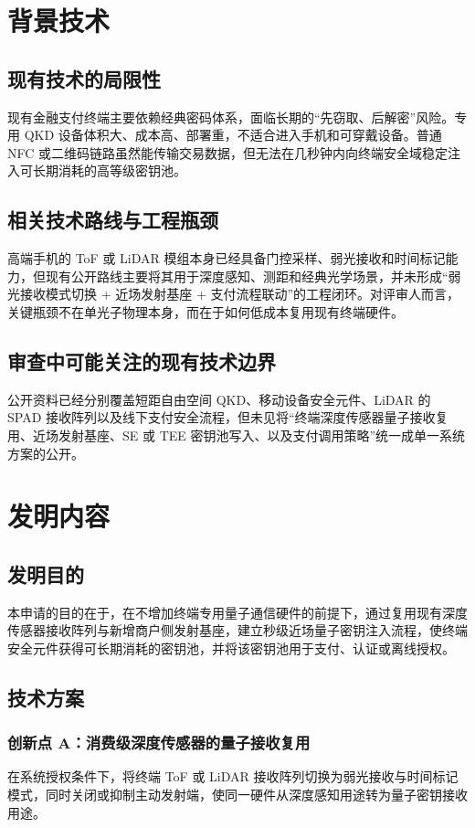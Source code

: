 ﻿\documentclass[12pt,a4paper]{article}
\begin{document}
\section{背景技术}
\subsection{现有技术的局限性}
现有金融支付终端主要依赖经典密码体系，面临长期的“先窃取、后解密”风险。专用 QKD 设备体积大、成本高、部署重，不适合进入手机和可穿戴设备。普通 NFC 或二维码链路虽然能传输交易数据，但无法在几秒钟内向终端安全域稳定注入可长期消耗的高等级密钥池。

\subsection{相关技术路线与工程瓶颈}
高端手机的 ToF 或 LiDAR 模组本身已经具备门控采样、弱光接收和时间标记能力，但现有公开路线主要将其用于深度感知、测距和经典光学场景，并未形成“弱光接收模式切换 + 近场发射基座 + 支付流程联动”的工程闭环。对评审人而言，关键瓶颈不在单光子物理本身，而在于如何低成本复用现有终端硬件。

\subsection{审查中可能关注的现有技术边界}
公开资料已经分别覆盖短距自由空间 QKD、移动设备安全元件、LiDAR 的 SPAD 接收阵列以及线下支付安全流程，但未见将“终端深度传感器量子接收复用、近场发射基座、SE 或 TEE 密钥池写入、以及支付调用策略”统一成单一系统方案的公开。

\section{发明内容}
\subsection{发明目的}
本申请的目的在于，在不增加终端专用量子通信硬件的前提下，通过复用现有深度传感器接收阵列与新增商户侧发射基座，建立秒级近场量子密钥注入流程，使终端安全元件获得可长期消耗的密钥池，并将该密钥池用于支付、认证或离线授权。

\subsection{技术方案}
\subsubsection{创新点 A：消费级深度传感器的量子接收复用}
在系统授权条件下，将终端 ToF 或 LiDAR 接收阵列切换为弱光接收与时间标记模式，同时关闭或抑制主动发射端，使同一硬件从深度感知用途转为量子密钥接收用途。
\end{document}
